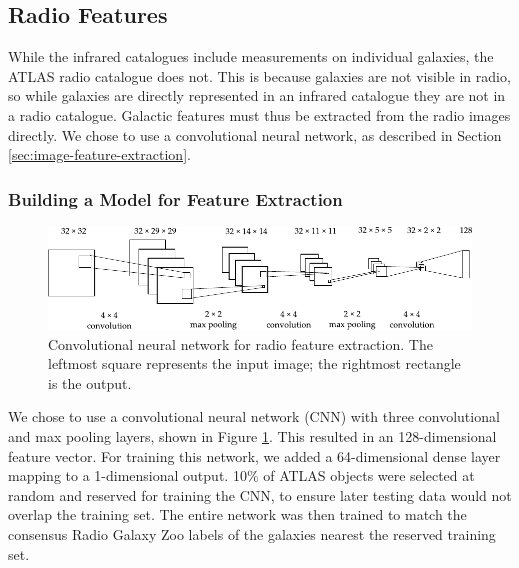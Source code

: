
  \subsection{Radio Features}
  \label{sec:radio-features}

    While the infrared catalogues include measurements on individual galaxies,
    the ATLAS radio catalogue does not. This is because galaxies are not
    visible in radio, so while galaxies are directly represented in an infrared
    catalogue they are not in a radio catalogue. Galactic features must thus be
    extracted from the radio images directly. We chose to use a convolutional
    neural network, as described in Section \ref{sec:image-feature-extraction}.

    \subsubsection{Building a Model for Feature Extraction}
    \label{sec:feature-extraction-model}

      \begin{figure}[!ht]
         \centering
         \includegraphics[width=\textwidth]{images/cnn_new.pdf}
         \caption{Convolutional neural network for radio feature extraction. The
           leftmost square represents the input image; the rightmost rectangle
           is the output.}
         \label{fig:radio-cnn}
       \end{figure}

      We chose to use a convolutional neural network (CNN) with three
      convolutional and max pooling layers, shown in Figure \ref{fig:radio-cnn}.
      This resulted in an 128-dimensional feature vector. For training this
      network, we added a 64-dimensional dense layer mapping to a 1-dimensional
      output. 10\% of ATLAS objects were selected at random and reserved for
      training the CNN, to ensure later testing data would not overlap the
      training set. The entire network was then trained to match the consensus
      Radio Galaxy Zoo labels of the galaxies nearest the reserved training set.

